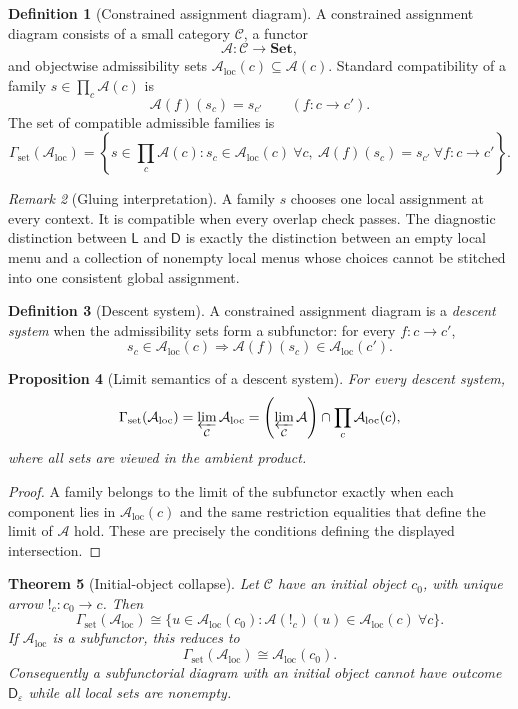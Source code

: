 \documentclass[11pt]{article}
\theoremstyle{plain}
\newtheorem{theorem}{Theorem}[section]
\newtheorem{proposition}[theorem]{Proposition}
\theoremstyle{definition}
\newtheorem{definition}[theorem]{Definition}
\theoremstyle{remark}
\newtheorem{remark}[theorem]{Remark}
\newcommand{\LocalAdm}{\mathcal{A}_{\mathrm{loc}}}
\newcommand{\eps}{\varepsilon}
\begin{document}
\begin{definition}[Constrained assignment diagram]\label{def:restr}
A constrained assignment diagram consists of a small category $\mathcal C$, a
functor
\[
\mathcal A:\mathcal C\to\mathbf{Set},
\]
and objectwise admissibility sets
$\LocalAdm(c)\subseteq\mathcal A(c)$. Standard compatibility of a family
$s\in\prod_c\mathcal A(c)$ is
\[
\mathcal A(f)(s_c)=s_{c'}
\qquad(f:c\to c').
\]
The set of compatible admissible families is
\[
\Gamma_{\mathrm{set}}(\LocalAdm)=
\left\{s\in\prod_c\mathcal A(c):
 s_c\in\LocalAdm(c)\ \forall c,
 \ \mathcal A(f)(s_c)=s_{c'}\ \forall f:c\to c'\right\}.
\]
\end{definition}

\begin{remark}[Gluing interpretation]
A family $s$ chooses one local assignment at every context. It is compatible
when every overlap check passes. The diagnostic distinction between $\mathsf L$
and $\mathsf D$ is exactly the distinction between an empty local menu and a
collection of nonempty local menus whose choices cannot be stitched into one
consistent global assignment.
\end{remark}

\begin{definition}[Descent system]\label{def:Av}
A constrained assignment diagram is a \emph{descent system} when the
admissibility sets form a subfunctor: for every $f:c\to c'$,
\[
s_c\in\LocalAdm(c)
\Longrightarrow
\mathcal A(f)(s_c)\in\LocalAdm(c').
\]
\end{definition}

\begin{proposition}[Limit semantics of a descent system]\label{prop:limit-semantics}
For every descent system,
\[
\Gamma_{\mathrm{set}}(\LocalAdm)
=\varprojlim_{\mathcal C}\LocalAdm
=\left(\varprojlim_{\mathcal C}\mathcal A\right)
\cap\prod_c\LocalAdm(c),
\]
where all sets are viewed in the ambient product.
\end{proposition}

\begin{proof}
A family belongs to the limit of the subfunctor exactly when each component lies
in $\LocalAdm(c)$ and the same restriction equalities that define the limit of
$\mathcal A$ hold. These are precisely the conditions defining the displayed
intersection.
\end{proof}

\begin{theorem}[Initial-object collapse]\label{thm:initial-collapse}
Let $\mathcal C$ have an initial object $c_0$, with unique arrow
$!_c:c_0\to c$. Then
\[
\Gamma_{\mathrm{set}}(\LocalAdm)
\cong
\{u\in\LocalAdm(c_0):
\mathcal A(!_c)(u)\in\LocalAdm(c)\ \forall c\}.
\]
If $\LocalAdm$ is a subfunctor, this reduces to
\[
\Gamma_{\mathrm{set}}(\LocalAdm)\cong\LocalAdm(c_0).
\]
Consequently a subfunctorial diagram with an initial object cannot have outcome
$\mathsf D_\eps$ while all local sets are nonempty.
\end{theorem}
\end{document}
